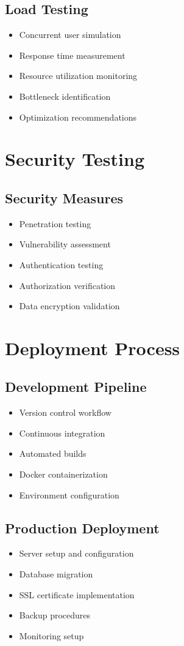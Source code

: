 \subsection{Load Testing}
\begin{itemize}
    \item Concurrent user simulation
    \item Response time measurement
    \item Resource utilization monitoring
    \item Bottleneck identification
    \item Optimization recommendations
\end{itemize}

\section{Security Testing}
\subsection{Security Measures}
\begin{itemize}
    \item Penetration testing
    \item Vulnerability assessment
    \item Authentication testing
    \item Authorization verification
    \item Data encryption validation
\end{itemize}

\section{Deployment Process}
\subsection{Development Pipeline}
\begin{itemize}
    \item Version control workflow
    \item Continuous integration
    \item Automated builds
    \item Docker containerization
    \item Environment configuration
\end{itemize}

\subsection{Production Deployment}
\begin{itemize}
    \item Server setup and configuration
    \item Database migration
    \item SSL certificate implementation
    \item Backup procedures
    \item Monitoring setup
\end{itemize}

